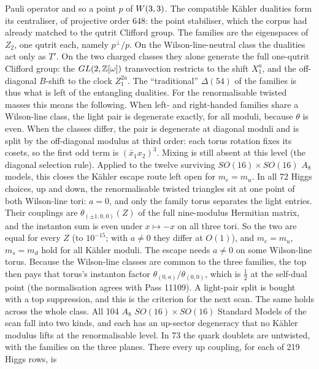 Pauli operator and so a point $p$ of $W(3,3)$. The compatible K\"ahler dualities form its centraliser, of projective order
$648$: the point stabiliser, which the corpus had already matched to the qutrit Clifford group. The families are the
eigenspaces of $Z_2$, one qutrit each, namely $p^\perp/p$. On the Wilson-line-neutral class the dualities act only as
$T'$. On the two charged classes they alone generate the full one-qutrit Clifford group: the $GL(2,\mathbb{Z}[\omega])$
transvection restricts to the shift $X_1^a$, and the off-diagonal $B$-shift to the clock $Z_1^{2a}$. The
``traditional'' $\Delta(54)$ of the families is thus what is left of the entangling dualities. For the renormalisable
twisted masses this means the following. When left- and right-handed families share a Wilson-line class, the light
pair is degenerate exactly, for all moduli, because $\theta$ is even. When the classes differ, the pair is degenerate
at diagonal moduli and is split by the off-diagonal modulus at third order: each torus rotation fixes its cosets, so
the first odd term is $(\bar x_1x_2)^3$. Mixing is still absent at this level (the diagonal selection rule).
Applied to the twelve surviving $SO(16)\times SO(16)$ $A_8$ models, this closes the K\"ahler escape route left open for
$m_c=m_u$. In all 72 Higgs choices, up and down, the renormalisable twisted triangles sit at one point of both
Wilson-line tori: $a=0$, and only the family torus separates the light entries. Their couplings are
$\theta_{(\pm1,0,0)}(Z)$ of the full nine-modulus Hermitian matrix, and the instanton sum is even under $x\mapsto -x$
on all three tori. So the two are equal for every $Z$ (to $10^{-15}$; with $a\neq0$ they differ at $O(1)$), and
$m_c=m_u$, $m_s=m_d$ hold for all K\"ahler moduli. The escape needs $a\neq0$ on some Wilson-line torus. Because the
Wilson-line classes are common to the three families, the top then pays that torus's instanton factor
$\theta_{(0,a)}/\theta_{(0,0)}$, which is $\tfrac12$ at the self-dual point (the normalisation agrees with Pass 11109). A
light-pair split is bought with a top suppression, and this is the criterion for the next scan.
The same holds across the whole class. All 104 $A_8$ $SO(16)\times SO(16)$ Standard Models of the scan fall into two
kinds, and each has an up-sector degeneracy that no K\"ahler modulus lifts at the renormalisable level. In 73 the quark
doublets are untwisted, with the families on the three planes. There every up coupling, for each of 219 Higgs rows, is
